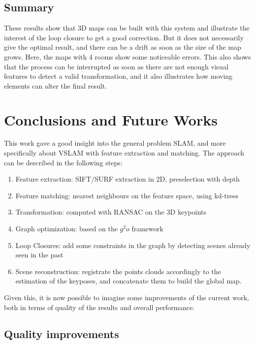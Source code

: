 \section{Summary}
These results show that 3D maps can be built with this system and illustrate the interest of the loop closure to get a good correction. But it does not necessarily  give the optimal result, and there can be a drift as soon as the size of the map grows. Here, the maps with 4 rooms show some noticeable errors. This also shows that the process can be interrupted as soon as there are not enough visual features to detect a valid transformation, and it also illustrates how moving elements can alter the final result.

\chapter{Conclusions and Future Works}
\label{chap:conclusion}

This work gave a good insight into the general problem \gls{SLAM}, and more specifically about \gls{VSLAM} with feature extraction and matching. The approach can be described in the following steps:
\begin{enumerate}
\item Feature extraction: \gls{SIFT}/\gls{SURF} extraction in 2D, preselection with depth
\item Feature matching: nearest neighbours on the feature space, using kd-trees
\item Transformation: computed with \gls{RANSAC} on the 3D keypoints
\item Graph optimization: based on the $g^2o$ framework
\item Loop Closures: add some constraints in the graph by detecting scenes already seen in the past
\item Scene reconstruction: registrate the points clouds accordingly to the estimation of the keyposes, and concatenate them to build the global map.
\end{enumerate}

Given this, it is now possible to imagine some improvements of the current work, both in terms of quality of the results and overall performance.

\section{Quality improvements}

